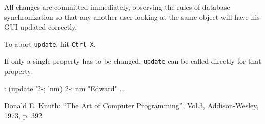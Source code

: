 All changes are committed immediately, observing the rules of database
synchronization so that any another user looking at the same object will
have his GUI updated correctly.

To abort \texttt{update}, hit \texttt{Ctrl-X}.

If only a single property has to be changed, \texttt{update} can be called
directly for that property:


\begin{wideverbatim}
: (update '{2-;} 'nm)
{2-;} nm "Edward"
...
\end{wideverbatim}

 

\begin{thebibliography}{[9]}

 Donald E. Knuth: ``The Art of Computer Programming'', Vol.3,
Addison-Wesley, 1973, p. 392

\end{thebibliography}



